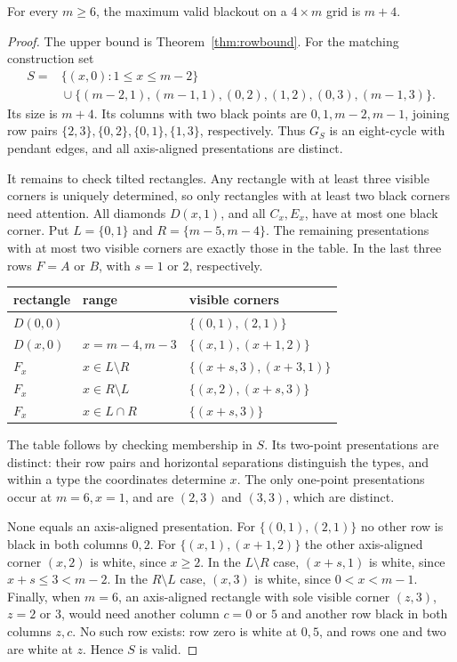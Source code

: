 \begin{theorem}\label{thm:fourrow}
For every $m\ge6$, the maximum valid blackout on a $4\times m$ grid is $m+4$.
\end{theorem}
\begin{proof}
The upper bound is Theorem~\ref{thm:rowbound}. For the matching construction set
\begin{align*}
S={}&\{(x,0):1\le x\le m-2\}\\
&{}\cup\{(m-2,1),(m-1,1),(0,2),(1,2),(0,3),(m-1,3)\}.
\end{align*}
Its size is $m+4$. Its columns with two black points are
$0,1,m-2,m-1$, joining row pairs
$\{2,3\},\{0,2\},\{0,1\},\{1,3\}$, respectively. Thus $G_S$ is an
eight-cycle with pendant edges, and all axis-aligned presentations are distinct.

It remains to check tilted rectangles. Any rectangle with at least three visible
corners is uniquely determined, so only rectangles with at least two black
corners need attention. All diamonds $D(x,1)$, and all $C_x,E_x$, have at most
one black corner. Put $L=\{0,1\}$ and $R=\{m-5,m-4\}$. The remaining
presentations with at most two visible corners are exactly those in the table.
In the last three rows $F=A$ or $B$, with $s=1$ or $2$, respectively.
\begin{center}\small
\begin{tabular}{lll}
\toprule
rectangle & range & visible corners\\
\midrule
$D(0,0)$ & & $\{(0,1),(2,1)\}$\\
$D(x,0)$ & $x=m-4,m-3$ & $\{(x,1),(x+1,2)\}$\\
$F_x$ & $x\in L\setminus R$ & $\{(x+s,3),(x+3,1)\}$\\
$F_x$ & $x\in R\setminus L$ & $\{(x,2),(x+s,3)\}$\\
$F_x$ & $x\in L\cap R$ & $\{(x+s,3)\}$\\
\bottomrule
\end{tabular}
\end{center}
The table follows by checking membership in $S$. Its two-point
presentations are distinct: their row pairs and horizontal separations distinguish
the types, and within a type the coordinates determine $x$. The only one-point
presentations occur at $m=6,x=1$, and are $(2,3)$ and $(3,3)$, which are distinct.

None equals an axis-aligned presentation. For $\{(0,1),(2,1)\}$ no other row
is black in both columns $0,2$. For $\{(x,1),(x+1,2)\}$ the other axis-aligned
corner $(x,2)$ is white, since $x\ge2$. In the $L\setminus R$ case,
$(x+s,1)$ is white, since $x+s\le3<m-2$. In the $R\setminus L$ case,
$(x,3)$ is white, since $0<x<m-1$. Finally, when $m=6$, an axis-aligned
rectangle with sole visible corner $(z,3)$, $z=2$ or $3$, would need another
column $c=0$ or $5$ and another row black in both columns $z,c$. No such row
exists: row zero is white at $0,5$, and rows one and two are white at $z$.
Hence $S$ is valid.
\end{proof}

